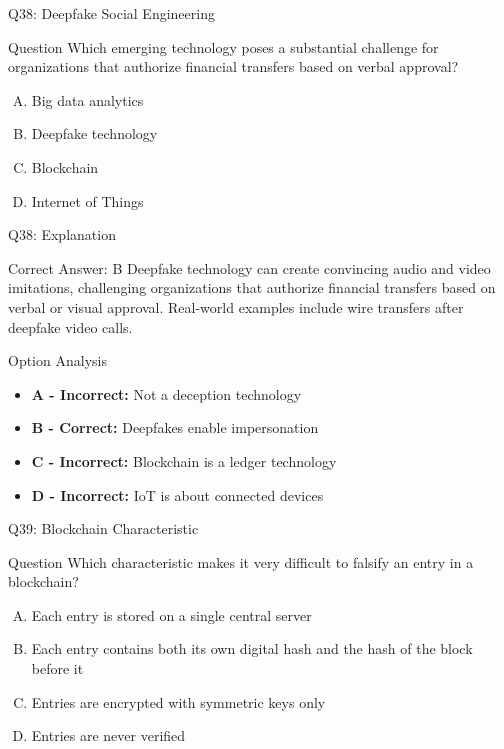 \documentclass{beamer}
\begin{document}
	\begin{frame}{Q38: Deepfake Social Engineering}
		\begin{block}{Question}
			Which emerging technology poses a substantial challenge for organizations that authorize financial transfers based on verbal approval?
		\end{block}
		\begin{enumerate}[(A)]
			\item Big data analytics
			\item Deepfake technology
			\item Blockchain
			\item Internet of Things
		\end{enumerate}
	\end{frame}
	
	\begin{frame}{Q38: Explanation}
		\begin{block}{Correct Answer: B}
			Deepfake technology can create convincing audio and video imitations, challenging organizations that authorize financial transfers based on verbal or visual approval. Real-world examples include wire transfers after deepfake video calls.
		\end{block}
		\begin{block}{Option Analysis}
			\begin{itemize}
				\item \textbf{A - Incorrect:} Not a deception technology
				\item \textbf{B - Correct:} Deepfakes enable impersonation
				\item \textbf{C - Incorrect:} Blockchain is a ledger technology
				\item \textbf{D - Incorrect:} IoT is about connected devices
			\end{itemize}
		\end{block}
	\end{frame}
	
	\begin{frame}{Q39: Blockchain Characteristic}
		\begin{block}{Question}
			Which characteristic makes it very difficult to falsify an entry in a blockchain?
		\end{block}
		\begin{enumerate}[(A)]
			\item Each entry is stored on a single central server
			\item Each entry contains both its own digital hash and the hash of the block before it
			\item Entries are encrypted with symmetric keys only
			\item Entries are never verified
		\end{enumerate}
	\end{frame}
	
\end{document}
